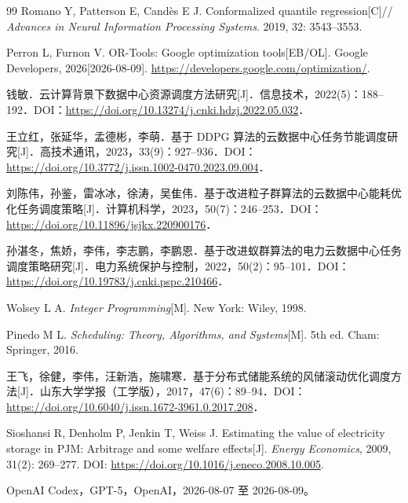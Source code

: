\begin{thebibliography}{99}
Romano Y, Patterson E, Cand\`es E J. Conformalized quantile regression[C]// \emph{Advances in Neural Information Processing Systems}. 2019, 32: 3543--3553.

Perron L, Furnon V. OR-Tools: Google optimization tools[EB/OL]. Google Developers, 2026[2026-08-09]. \url{https://developers.google.com/optimization/}.

钱敏．云计算背景下数据中心资源调度方法研究[J]．信息技术，2022(5)：188--192．DOI：\url{https://doi.org/10.13274/j.cnki.hdzj.2022.05.032}．

王立红，张延华，孟德彬，李萌．基于 DDPG 算法的云数据中心任务节能调度研究[J]．高技术通讯，2023，33(9)：927--936．DOI：\url{https://doi.org/10.3772/j.issn.1002-0470.2023.09.004}．

刘陈伟，孙鉴，雷冰冰，徐涛，吴隹伟．基于改进粒子群算法的云数据中心能耗优化任务调度策略[J]．计算机科学，2023，50(7)：246--253．DOI：\url{https://doi.org/10.11896/jsjkx.220900176}．

孙湛冬，焦娇，李伟，李志鹏，李鹏恩．基于改进蚁群算法的电力云数据中心任务调度策略研究[J]．电力系统保护与控制，2022，50(2)：95--101．DOI：\url{https://doi.org/10.19783/j.cnki.pspc.210466}．

Wolsey L A. \emph{Integer Programming}[M]. New York: Wiley, 1998.

Pinedo M L. \emph{Scheduling: Theory, Algorithms, and Systems}[M]. 5th ed. Cham: Springer, 2016.

王飞，徐健，李伟，汪新浩，施啸寒．基于分布式储能系统的风储滚动优化调度方法[J]．山东大学学报（工学版），2017，47(6)：89--94．DOI：\url{https://doi.org/10.6040/j.issn.1672-3961.0.2017.208}．

Sioshansi R, Denholm P, Jenkin T, Weiss J. Estimating the value of electricity storage in PJM: Arbitrage and some welfare effects[J]. \emph{Energy Economics}, 2009, 31(2): 269--277. DOI: \url{https://doi.org/10.1016/j.eneco.2008.10.005}.

\nocite{openai-codex}
OpenAI Codex，GPT-5，OpenAI，2026-08-07 至 2026-08-09。

\end{thebibliography}
